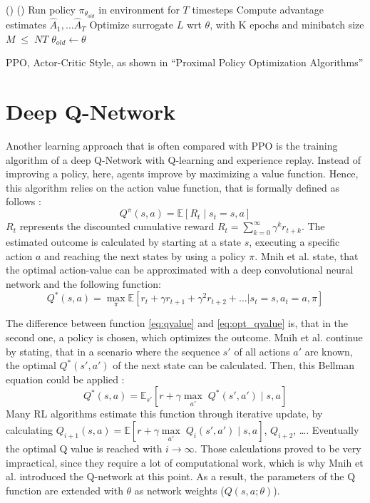 \begin{algorithm}[H]
    \DontPrintSemicolon
    \For(){}{
        \For(){}{
            Run policy $\pi_{\theta_{old}}$ in environment for $T$ timesteps \;
            Compute advantage estimates $\hat{A}_{1},...\hat{A}_{T}$
        }
        Optimize surrogate $L$ wrt $\theta$, with K epochs and minibatch size $M \; \leq \; NT$ \;
        $\theta_{old} \leftarrow \theta$
    }
    \caption{PPO, Actor-Critic Style, as shown in ``Proximal Policy Optimization Algorithms'' \cite{scwo17}}\label{algo:ppo_algo_code}
\end{algorithm}

\section{Deep Q-Network}\label{dqn}
Another learning approach that is often compared with PPO is the training algorithm of a deep Q-Network with Q-learning and experience replay. Instead of improving a policy, here, agents improve by maximizing a value function. Hence, this algorithm relies on the action value function, that is formally defined as follows \cite{mnba16}:
\begin{equation}\label{eq:qvalue}
    Q^\pi(s,a) = \mathbb{E} \left[ R_t \mid s_t = s,a \right]
\end{equation} 
$R_t$ represents the discounted cumulative reward $R_t=\sum^{\infty}_{k=0} \gamma^k r_{t+k}$. The estimated outcome is calculated by starting at a state $s$, executing a specific action $a$ and reaching the next states by using a policy $\pi$. Mnih et al. \cite{mnka15} state, that the optimal action-value can be approximated with a deep convolutional neural network and the following function:
\begin{equation}\label{eq:opt_qvalue}
    Q^*(s,a) =  \underset{\pi} \max \mathbb{E}\left[ r_{t} + \gamma r_{t+1} + \gamma^2 r_{t+2} + \ldots | s_t = s, a_t = a, \pi \right]
\end{equation}

The difference between function \eqref{eq:qvalue} and \eqref{eq:opt_qvalue} is, that in the second one, a policy is chosen, which optimizes the outcome. Mnih et al. continue by stating, that in a scenario where the sequence $s'$ of all actions $a'$ are known, the optimal $Q^*(s',a')$ of the next state can be calculated. Then, this Bellman equation could be applied \cite{mnba16}: 
\begin{equation}\label{eq:bel_qvalue}
    Q^*(s,a) =  \mathbb{E}_{s'} \left[ r+ \gamma \underset{a'}\max \; Q^* (s', a') \mid s,a \right]
\end{equation}
Many RL algorithms estimate this function through iterative update, by calculating $Q_{i+1}(s,a) =  \mathbb{E} \left[ r+ \gamma \underset{a'}\max \; Q_i (s', a') \mid s,a \right]$, $Q_{i+2}$, \dots \cite{mnka13}. Eventually the optimal Q value is reached with $i\rightarrow \infty$. Those calculations proved to be very impractical, since they require a lot of computational work, which is why Mnih et al. introduced the Q-network at this point. As a result, the parameters of the Q function are extended with $\theta$ as network weights ($Q(s,a;\theta)$).


